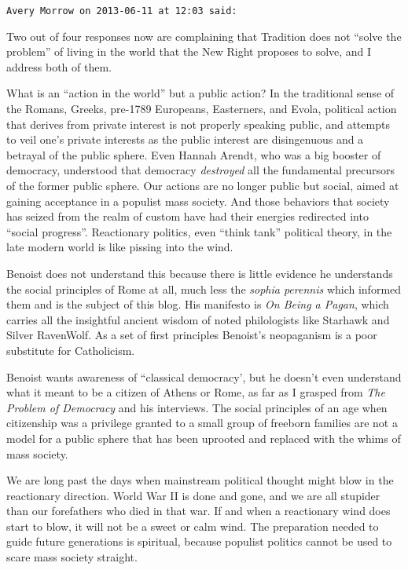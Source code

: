 \begin{footnotesize}
\begin{sffamily}
\hfill

\texttt{Avery Morrow on 2013-06-11 at 12:03 said:}

Two out of four responses now are complaining that Tradition does not ``solve the problem'' of living in the world that the New Right proposes to solve, and I address both of them.

What is an ``action in the world'' but a public action? In the traditional sense of the Romans, Greeks, pre-1789 Europeans, Easterners, and Evola, political action that derives from private interest is not properly speaking public, and attempts to veil one's private interests as the public interest are disingenuous and a betrayal of the public sphere. Even Hannah Arendt, who was a big booster of democracy, understood that democracy \emph{destroyed} all the fundamental precursors of the former public sphere. Our actions are no longer public but social, aimed at gaining acceptance in a populist mass society. And those behaviors that society has seized from the realm of custom have had their energies redirected into ``social progress''. Reactionary politics, even ``think tank'' political theory, in the late modern world is like pissing into the wind.

Benoist does not understand this because there is little evidence he understands the social principles of Rome at all, much less the \emph{sophia perennis} which informed them and is the subject of this blog. His manifesto is \emph{On Being a Pagan}, which carries all the insightful ancient wisdom of noted philologists like Starhawk and Silver RavenWolf. As a set of first principles Benoist's neopaganism is a poor substitute for Catholicism.

Benoist wants awareness of ``classical democracy', but he doesn't even understand what it meant to be a citizen of Athens or Rome, as far as I grasped from \emph{The Problem of Democracy} and his interviews. The social principles of an age when citizenship was a privilege granted to a small group of freeborn families are not a model for a public sphere that has been uprooted and replaced with the whims of mass society.

We are long past the days when mainstream political thought might blow in the reactionary direction. World War II is done and gone, and we are all stupider than our forefathers who died in that war. If and when a reactionary wind does start to blow, it will not be a sweet or calm wind. The preparation needed to guide future generations is spiritual, because populist politics cannot be used to scare mass society straight.


\end{sffamily}
\end{footnotesize}
